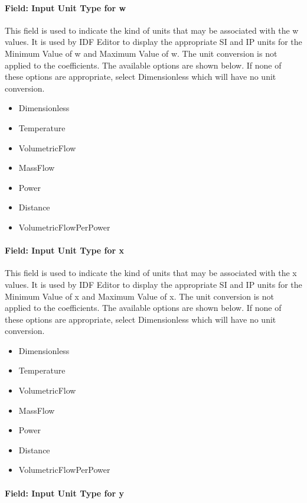 \paragraph{Field: Input Unit Type for w}\label{field-input-unit-type-for-w-1}

This field is used to indicate the kind of units that may be associated with the w values. It is used by IDF Editor to display the appropriate SI and IP units for the Minimum Value of w and Maximum Value of w. The unit conversion is not applied to the coefficients. The available options are shown below. If none of these options are appropriate, select Dimensionless which will have no unit conversion.

\begin{itemize}
\item
  Dimensionless
\item
  Temperature
\item
  VolumetricFlow
\item
  MassFlow
\item
  Power
\item
  Distance
\item
  VolumetricFlowPerPower
\end{itemize}

\paragraph{Field: Input Unit Type for x}\label{field-input-unit-type-for-x-18}

This field is used to indicate the kind of units that may be associated with the x values. It is used by IDF Editor to display the appropriate SI and IP units for the Minimum Value of x and Maximum Value of x. The unit conversion is not applied to the coefficients. The available options are shown below. If none of these options are appropriate, select Dimensionless which will have no unit conversion.

\begin{itemize}
\item
  Dimensionless
\item
  Temperature
\item
  VolumetricFlow
\item
  MassFlow
\item
  Power
\item
  Distance
\item
  VolumetricFlowPerPower
\end{itemize}

\paragraph{Field: Input Unit Type for y}\label{field-input-unit-type-for-y-7}

